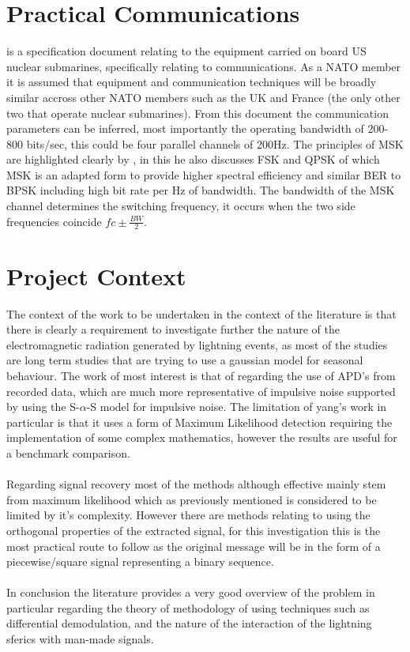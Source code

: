 \section{Practical Communications}
\cite{appendixA} is a specification document relating to the equipment carried on board US nuclear submarines, specifically relating to communications. As a NATO member it is assumed that equipment and communication techniques will be broadly similar accross other NATO members such as the UK and France (the only other two that operate nuclear submarines). From this document the communication parameters can be inferred, most importantly the operating bandwidth of 200-800 bits/sec, this could be four parallel channels of 200Hz. The principles of MSK are highlighted clearly by \cite{Pasupathy1979}, in this he also discusses FSK and QPSK of which MSK is an adapted form to provide higher spectral efficiency and similar BER to BPSK including high bit rate per Hz of bandwidth. 
The bandwidth of the MSK channel determines the switching frequency, it occurs when the two side frequencies coincide $fc\pm\frac{BW}{2}$.

\section{Project Context}
The context of the work to be undertaken in the context of the literature is that there is clearly a requirement to investigate further the nature of the electromagnetic radiation generated by lightning events, as most of the studies are long term studies that are trying to use a gaussian model for seasonal behaviour. The work of most interest is that of \cite{Chrissan2000} regarding the use of APD's from recorded data, which are much more representative of impulsive noise supported by \cite{Yang2016} using the S-$\alpha$-S model for impulsive noise. The limitation of yang's work in particular is that it uses a form of Maximum Likelihood detection requiring the implementation of some complex mathematics, however the results are useful for a benchmark comparison. 
\\\\
Regarding signal recovery most of the methods although effective mainly stem from maximum likelihood which as previously mentioned is considered to be limited by it's complexity. However there are methods relating to using the orthogonal properties of the extracted signal, for this investigation this is the most practical route to follow as the original message will be in the form of a piecewise/square signal representing a binary sequence.
\\\\
In conclusion the literature provides a very good overview of the problem in particular regarding the theory of methodology of using techniques such as differential demodulation, and the nature of the interaction of the lightning sferics with man-made signals.